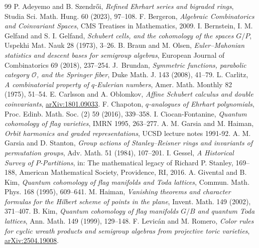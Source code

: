 \documentclass[a4paper,11pt]{amsart}
\theoremstyle{plain}
\theoremstyle{definition}
\begin{document}
\begin{thebibliography}{99}
 P. Adeyemo and B. Szendr{\H o}i,  {\em Refined Ehrhart series and bigraded rings}, Studia Sci. Math. Hung. 60 (2023), 97--108.
 F. Bergeron, {\em Algebraic Combinatorics and Coinvariant Spaces}, CMS Treatises in Mathematics, 2009. 
 I. Bernstein, I. M. Gelfand and S. I. Gelfand, {\em Schubert cells, and the cohomology of the spaces $G/P$}, Uspekhi Mat. Nauk 28 (1973), 3--26.
 B. Braun and M. Olsen, {\em Euler–Mahonian statistics and descent bases for semigroup algebras}, European Journal of Combinatorics 69 (2018), 237--254. 
 J.~Brundan, {\em Symmetric functions, parabolic category ${\mathcal O}$, and the Springer fiber}, Duke Math. J. 143 (2008), 41--79.
 L. Carlitz, {\em A combinatorial property of $q$-Eulerian numbers}, Amer. Math. Monthly 82 (1975), 51--54.
 E. Carlsson and A. Oblomkov, {\em Affine Schubert calculus and double coinvariants}, \href{https://arxiv.org/abs/1801.09033}{arXiv:1801.09033}.
 F. Chapoton, {\em $q$-analogues of Ehrhart polynomials}, Proc. Edinb. Math. Soc. (2) 59 (2016), 339--358. 
 I. Ciocan-Fontanine, {\em Quantum cohomology of flag varieties}, IMRN 1995, 263--277.
 A. M. Garsia and M. Haiman, {\em Orbit harmonics and graded representations}, UCSD lecture notes 1991-92. 
 A. M. Garsia and D. Stanton, {\em Group actions of Stanley--Reisner rings and invariants of permutation groups}, Adv. Math. 51 (1984), 107--201.
 I. Gessel, {\em A Historical Survey of $P$-Partitions}, in: The mathematical legacy of Richard P. Stanley, 169--188, American Mathematical Society, Providence, RI, 2016.
 A. Givental and B. Kim, {\em Quantum cohomology of flag manifolds and Toda lattices}, Commun. Math. Phys. 168 (1995), 609--641.
 M. Haiman, {\em Vanishing theorems and character formulas for the Hilbert scheme of points in the plane}, Invent. Math. 149 (2002), 371--407.
 B. Kim, {\em Quantum cohomology of flag manifolds $G/B$ and quantum Toda lattices}, Ann. Math. 149 (1999), 129--148.
 F. Levi\-c\'an and M. Romero, {\em Color rules for cyclic wreath products and semigroup algebras from projective toric varieties}, \href{https://arxiv.org/abs/2504.19008}{arXiv:2504.19008}.

\end{thebibliography}
\end{document}
